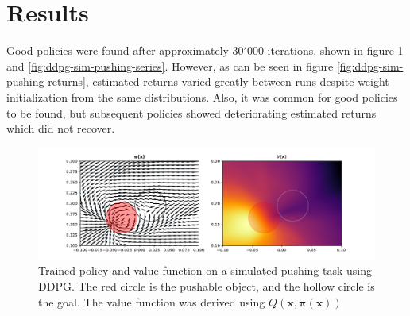 \section{Results}

Good policies were found after approximately $30'000$ iterations, shown in
figure \ref{fig:ddpg-sim-pushing-pi-v} and \ref{fig:ddpg-sim-pushing-series}.
However, as can be seen in figure \ref{fig:ddpg-sim-pushing-returns}, estimated
returns varied greatly between runs despite weight initialization from the same
distributions. Also, it was common for good policies to be found, but
subsequent policies showed deteriorating estimated returns which did not
recover.

\begin{figure}[h!]
    \centering
    \includegraphics[width=1.0 \textwidth]{res/ddpg-pushing-pi-v.pdf}

    \caption{Trained policy and value function on a simulated pushing task
    using DDPG. The red circle is the pushable object, and the hollow circle is
    the goal. The value function was derived using $Q(\mathbf{x, \pi(x)})$}

    \label{fig:ddpg-sim-pushing-pi-v}

\end{figure}

